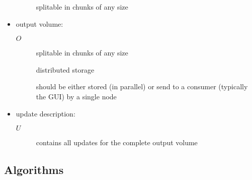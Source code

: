 \documentclass[12pt,a4paper]{article}
\newcommand{\outp}{O}
\newcommand{\updatedescr}{U}
\begin{document}
\begin{itemize}
\begin{description}
    splitable in chunks of any size
  \end{description}

\item output volume:
  \begin{description}
  \item[$\outp$] splitable in chunks of any size

    distributed storage

    should be either stored (in parallel) or send to a consumer
    (typically the GUI) by a single node
  \end{description}

\item update description:
  \begin{description}
  \item[$\updatedescr$] contains all updates for the complete output volume
  \end{description}

\end{itemize}

\subsection*{Algorithms}
\end{document}
